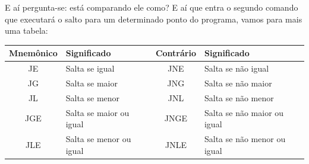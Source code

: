 E aí pergunta-se: está comparando ele como? E aí que entra o segundo comando que executará o salto para um determinado ponto do programa, vamos para mais uma tabela:
\begin{table}[H]
	\centering 
	\begin{tabular}{c | l | c | l }
		\textbf{Mnemônico} & \textbf{Significado} & \textbf{Contrário} & \textbf{Significado} \\ \hline
		JE & Salta se igual & JNE & Salta se não igual \\
		JG & Salta se maior & JNG & Salta se não maior \\
		JL & Salta se menor & JNL & Salta se não menor \\
		JGE & Salta se maior ou igual & JNGE & Salta se não maior ou igual \\
		JLE & Salta se menor ou igual & JNLE & Salta se não menor ou igual \\
	\end{tabular}
\end{table}

